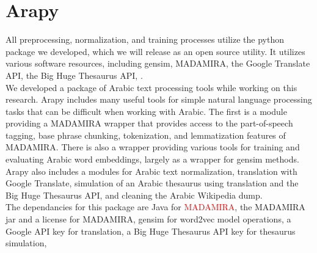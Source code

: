 \section{Arapy}
\label{sec:arapy}

All preprocessing, normalization, and training processes utilize the python package we developed, which we will release as an open source utility. It utilizes various software resources, including gensim, MADAMIRA, the Google Translate API, the Big Huge Thesaurus API, \cite{google:online,bhl:online}. 
\\
We developed a package of Arabic text processing tools while working on this research. Arapy includes many useful tools for simple natural language processing tasks that can be difficult when working with Arabic. The first is a module providing a MADAMIRA wrapper that provides access to the part-of-speech tagging, base phrase chunking, tokenization, and lemmatization features of MADAMIRA. There is also a wrapper providing various tools for training and evaluating Arabic word embeddings, largely as a wrapper for gensim methods. Arapy also includes a modules for Arabic text normalization, translation with Google Translate, simulation of an Arabic thesaurus using translation and the Big Huge Thesaurus API, and cleaning the Arabic Wikipedia dump.
\\
The dependancies for this package are Java for \textcolor{red}{MADAMIRA}, the MADAMIRA jar and a license for MADAMIRA, gensim for word2vec model operations, a Google API key for translation, a Big Huge Thesaurus API key for thesaurus simulation, 
